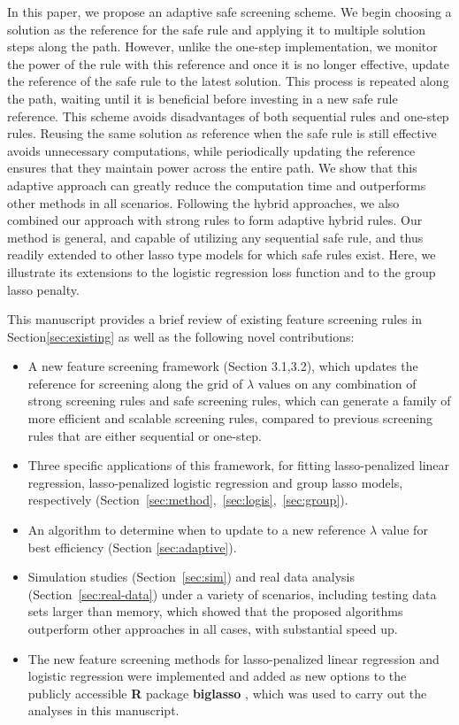 In this paper, we propose an adaptive safe screening scheme. We begin choosing a solution as the reference for the safe rule and applying it to multiple solution steps along the path. However, unlike the one-step implementation, we monitor the power of the rule with this reference and once it is no longer effective, update the reference of the safe rule to the latest solution.  This process is repeated along the path, waiting until it is beneficial before investing in a new safe rule reference. This scheme avoids disadvantages of both sequential rules and one-step rules. Reusing the same solution as reference when the safe rule is still effective avoids unnecessary computations, while periodically updating the reference ensures that they maintain power across the entire path. We show that this adaptive approach can greatly reduce the computation time and outperforms other methods in all scenarios. Following the hybrid approaches, we also combined our approach with strong rules to form adaptive hybrid rules. Our method is general, and capable of utilizing any sequential safe rule, and thus readily extended to other lasso type models for which safe rules exist. Here, we illustrate its extensions to the logistic regression loss function and to the group lasso penalty.

This manuscript provides a brief review of existing feature screening rules in Section\ref{sec:existing} as well as the following novel contributions:

\begin{itemize}
    \item A new feature screening framework (Section 3.1,3.2), which updates the reference for screening along the grid of $\lambda$ values on any combination of strong screening rules and safe screening rules, which can generate a family of more efficient and scalable screening rules, compared to previous screening rules that are either sequential or one-step.
    \item Three specific applications of this framework, for fitting lasso-penalized linear regression, lasso-penalized logistic regression and group lasso models, respectively (Section~\ref{sec:method},~\ref{sec:logis},~\ref{sec:group}).
    \item An algorithm to determine when to update to a new reference $\lambda$ value for best efficiency (Section \ref{sec:adaptive}).
    \item Simulation studies (Section~\ref{sec:sim}) and real data analysis (Section~\ref{sec:real-data}) under a variety of scenarios, including testing data sets larger than memory, which showed that the proposed algorithms outperform other approaches in all cases, with substantial speed up.
    \item The new feature screening methods for lasso-penalized linear regression and logistic regression were implemented and added as new options to the publicly accessible \textbf{R} package \textbf{biglasso} \citep{zeng2017biglasso}, which was used to carry out the analyses in this manuscript.
\end{itemize}

